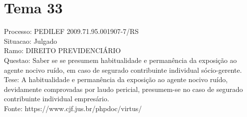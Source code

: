 \documentclass[12pt]{article}
\begin{document}
\section*{Tema 33}
Processo: PEDILEF 2009.71.95.001907-7/RS\\
Situacao: Julgado\\
Ramo: DIREITO PREVIDENCIÁRIO\\
Questao: Saber se se presumem habitualidade e permanência da exposição ao agente nocivo ruído, em caso de segurado contribuinte individual sócio-gerente.\\
Tese: A habitualidade e permanência da exposição ao agente nocivo ruído, devidamente comprovadas por laudo pericial, presumem-se no caso de segurado contribuinte individual empresário.\\
Fonte: https://www.cjf.jus.br/phpdoc/virtus/
\end{document}
